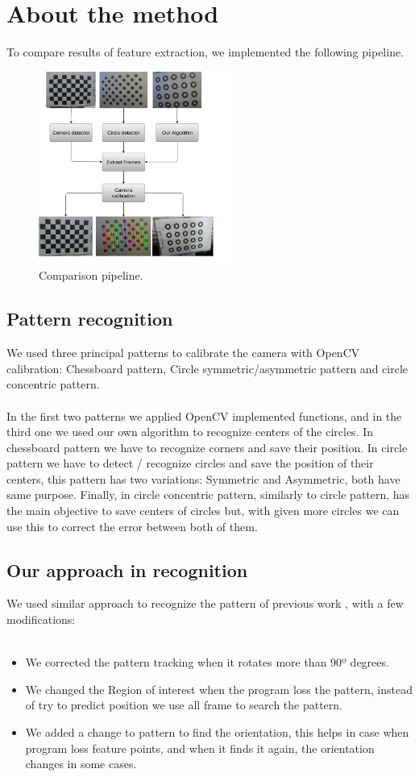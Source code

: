 \documentclass[journal]{IEEEtran}
\begin{document}
\section{About the method}
To compare results of feature extraction, we implemented the following pipeline.

\begin{figure}[H]
\centering
\includegraphics[width=2.5in]{_img/img_report3_pipeline.png}
\caption{Comparison pipeline.}
\end{figure}

\subsection{ Pattern recognition }
We used three principal patterns to calibrate the camera with OpenCV calibration: Chessboard pattern, Circle symmetric/asymmetric pattern and circle concentric pattern. 
\\
\\
In the first two patterns we applied OpenCV implemented functions, and in the third one we used our own algorithm to recognize centers of the circles. In chessboard pattern we have to recognize corners and save their position. In circle pattern we have to detect / recognize circles and save the position of their centers, this pattern has two variations: Symmetric and Asymmetric, both have same purpose. Finally, in circle concentric pattern, similarly to circle pattern, has the main objective to save centers of circles but, with given more circles we can use this to correct the error between both of them.

\subsection{ Our approach in recognition }
We used similar approach to recognize the pattern of previous work \cite{PreviousWork}, with a few modifications:\\
\\
\begin{itemize}
\item We corrected the pattern tracking when it rotates more than 90º degrees.
\item We changed the Region of interest when the program loss the pattern, instead of try to predict position we use all frame to search the pattern.
\item We added a change to pattern to find the orientation, this helps in case when program loss feature points, and when it finds it again, the orientation changes in some cases.
\end{itemize}
\end{document}
